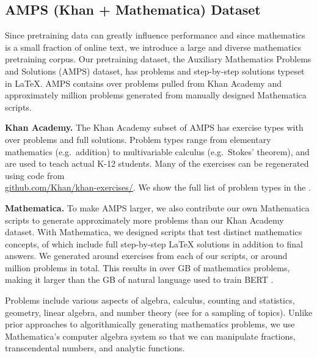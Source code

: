 \documentclass{article}
\begin{document}
\subsection{AMPS (Khan + Mathematica) Dataset}
Since pretraining data can greatly influence performance \citep{Hernandez2021ScalingLF,Gururangan2020DontSP} and since mathematics is a small fraction of online text, we introduce a large and diverse mathematics pretraining corpus. Our pretraining dataset, the Auxiliary Mathematics Problems and Solutions (AMPS) dataset, has problems and step-by-step solutions typeset in \LaTeX{}. AMPS contains over  problems pulled from Khan Academy and approximately  million problems generated from manually designed Mathematica scripts.

\textbf{Khan Academy.}\quad
The Khan Academy subset of AMPS has  exercise types with over  problems and full solutions. Problem types range from elementary mathematics (e.g.~addition) to multivariable calculus (e.g.~Stokes' theorem), and are used to teach actual K-12 students. Many of the exercises can be regenerated using code from\\
\href{https://github.com/Khan/khan-exercises/}{github.com/Khan/khan-exercises/}. We show the full list of problem types in the . 

\textbf{Mathematica.}\quad
To make AMPS larger, we also contribute our own Mathematica scripts to generate approximately  more problems than our Khan Academy dataset. With Mathematica, we designed  scripts that test distinct mathematics concepts,  of which include full step-by-step \LaTeX{} solutions in addition to final answers. We generated around  exercises from each of our scripts, or around  million problems in total. This results in over  GB of mathematics problems, making it larger than the  GB of natural language used to train BERT \citep{Devlin2019BERTPO}.

Problems include various aspects of algebra, calculus, counting and statistics, geometry, linear algebra, and number theory (see  for a sampling of topics). Unlike prior approaches to algorithmically generating mathematics problems, we use Mathematica's computer algebra system so that we can manipulate fractions, transcendental numbers, and analytic functions. 


    
    
    
\end{document}
